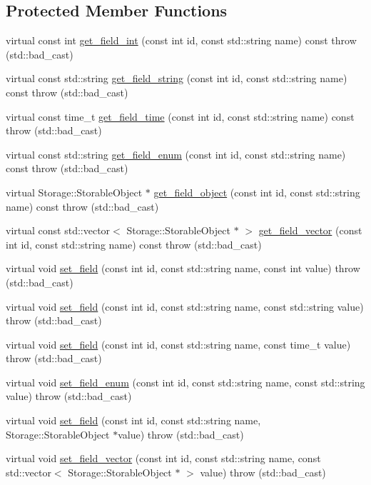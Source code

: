 \subsection*{Protected Member Functions}
\begin{DoxyCompactItemize}
\item 
virtual const int \hyperlink{classDummyStorage_a275263eba82a652005292f01a120af8e}{get\_\-field\_\-int} (const int id, const std::string name) const   throw (std::bad\_\-cast)
\item 
virtual const std::string \hyperlink{classDummyStorage_a410ef9d239193e25f830c49140e18293}{get\_\-field\_\-string} (const int id, const std::string name) const   throw (std::bad\_\-cast)
\item 
virtual const time\_\-t \hyperlink{classDummyStorage_a978ef9d688175e3739bb478f4c9b5313}{get\_\-field\_\-time} (const int id, const std::string name) const   throw (std::bad\_\-cast)
\item 
virtual const std::string \hyperlink{classDummyStorage_a1101739c23fbf79b009558553180ef1a}{get\_\-field\_\-enum} (const int id, const std::string name) const   throw (std::bad\_\-cast)
\item 
virtual Storage::StorableObject $\ast$ \hyperlink{classDummyStorage_a7135d171d9b83c2fbf72851fa9ea852a}{get\_\-field\_\-object} (const int id, const std::string name) const   throw (std::bad\_\-cast)
\item 
virtual const std::vector$<$ Storage::StorableObject $\ast$ $>$ \hyperlink{classDummyStorage_afe36af3f3147027ebb6447192201c790}{get\_\-field\_\-vector} (const int id, const std::string name) const   throw (std::bad\_\-cast)
\item 
virtual void \hyperlink{classDummyStorage_ab22488d00b8969af5356bc344672bd18}{set\_\-field} (const int id, const std::string name, const int value)  throw (std::bad\_\-cast)
\item 
virtual void \hyperlink{classDummyStorage_aaa0d3249ea3207fae78253b191b80854}{set\_\-field} (const int id, const std::string name, const std::string value)  throw (std::bad\_\-cast)
\item 
virtual void \hyperlink{classDummyStorage_a51662a853e821fda1828e8756d58f1df}{set\_\-field} (const int id, const std::string name, const time\_\-t value)  throw (std::bad\_\-cast)
\item 
virtual void \hyperlink{classDummyStorage_a0655a6f7c822adbe174d1c7fe7c9ea34}{set\_\-field\_\-enum} (const int id, const std::string name, const std::string value)  throw (std::bad\_\-cast)
\item 
virtual void \hyperlink{classDummyStorage_ae2e39a3cee22fd90790a7528f0c7ad59}{set\_\-field} (const int id, const std::string name, Storage::StorableObject $\ast$value)  throw (std::bad\_\-cast)
\item 
virtual void \hyperlink{classDummyStorage_a6102ef89119b0ee1525439b3fd7043ce}{set\_\-field\_\-vector} (const int id, const std::string name, const std::vector$<$ Storage::StorableObject $\ast$ $>$ value)  throw (std::bad\_\-cast)
\end{DoxyCompactItemize}


